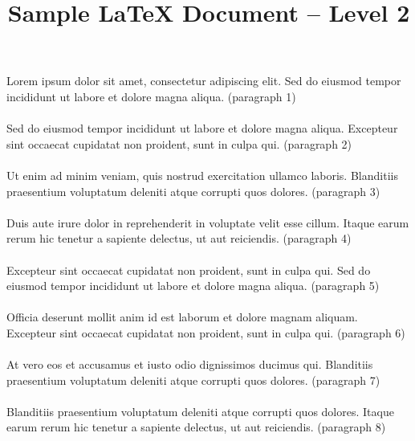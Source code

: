 \documentclass{article}
\title{Sample LaTeX Document -- Level 2}
\begin{document}
\maketitle
\paragraph{} Lorem ipsum dolor sit amet, consectetur adipiscing elit. Sed do eiusmod tempor incididunt ut labore et dolore magna aliqua. (paragraph 1)

\paragraph{} Sed do eiusmod tempor incididunt ut labore et dolore magna aliqua. Excepteur sint occaecat cupidatat non proident, sunt in culpa qui. (paragraph 2)

\paragraph{} Ut enim ad minim veniam, quis nostrud exercitation ullamco laboris. Blanditiis praesentium voluptatum deleniti atque corrupti quos dolores. (paragraph 3)

\paragraph{} Duis aute irure dolor in reprehenderit in voluptate velit esse cillum. Itaque earum rerum hic tenetur a sapiente delectus, ut aut reiciendis. (paragraph 4)

\paragraph{} Excepteur sint occaecat cupidatat non proident, sunt in culpa qui. Sed do eiusmod tempor incididunt ut labore et dolore magna aliqua. (paragraph 5)

\paragraph{} Officia deserunt mollit anim id est laborum et dolore magnam aliquam. Excepteur sint occaecat cupidatat non proident, sunt in culpa qui. (paragraph 6)

\paragraph{} At vero eos et accusamus et iusto odio dignissimos ducimus qui. Blanditiis praesentium voluptatum deleniti atque corrupti quos dolores. (paragraph 7)

\paragraph{} Blanditiis praesentium voluptatum deleniti atque corrupti quos dolores. Itaque earum rerum hic tenetur a sapiente delectus, ut aut reiciendis. (paragraph 8)
\end{document}
